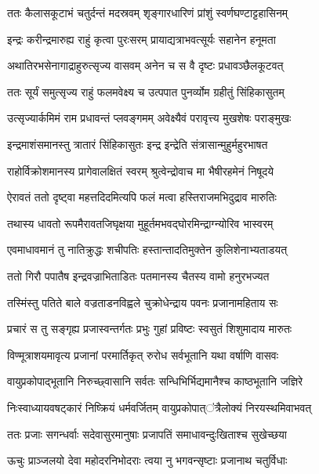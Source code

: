\twolineshloka
{ततः कैलासकूटाभं चतुर्दन्तं मदस्रवम्}
{शृङ्गारधारिणं प्रांशुं स्वर्णघण्टाट्टहासिनम्} %

\twolineshloka
{इन्द्रः करीन्द्रमारुह्य राहुं कृत्वा पुरःसरम्}
{प्रायाद्यत्राभवत्सूर्यः सहानेन हनूमता} %

\twolineshloka
{अथातिरभसेनागाद्राहुरुत्सृज्य वासवम्}
{अनेन च स वै दृष्टः प्रधावञ्छैलकूटवत्} %

\twolineshloka
{ततः सूर्यं समुत्सृज्य राहुं फलमवेक्ष्य च}
{उत्पपात पुनर्व्योम ग्रहीतुं सिंहिकासुतम्} %

\twolineshloka
{उत्सृज्यार्कमिमं राम प्रधावन्तं प्लवङ्गमम्}
{अवेक्ष्यैवं परावृत्त्य मुखशेषः पराङ्मुखः} %

\twolineshloka
{इन्द्रमाशंसमानस्तु त्रातारं सिंहिकासुतः}
{इन्द्र इन्द्रेति संत्रासान्मुहुर्महुरभाषत} %

\twolineshloka
{राहोर्विक्रोशमानस्य प्रागेवालक्षितं स्वरम्}
{श्रुत्वेन्द्रोवाच मा भैषीरहमेनं निषूदये} %

\twolineshloka
{ऐरावतं ततो दृष्ट्वा महत्तदिदमित्यपि}
{फलं मत्वा हस्तिराजमभिदुद्राव मारुतिः} %

\twolineshloka
{तथास्य धावतो रूपमैरावतजिघृक्षया}
{मुहूर्तमभवद्घोरमिन्द्राग्न्योरिव भास्वरम्} %

\twolineshloka
{एवमाधावमानं तु नातिक्रुद्धः शचीपतिः}
{हस्तान्तादतिमुक्तेन कुलिशेनाभ्यताडयत्} %

\twolineshloka
{ततो गिरौ पपातैष इन्द्रवज्राभिताडितः}
{पतमानस्य चैतस्य वामो हनुरभज्यत} %

\twolineshloka
{तस्मिंस्तु पतिते बाले वज्रताडनविह्वले}
{चुक्रोधेन्द्राय पवनः प्रजानामहिताय सः} %

\twolineshloka
{प्रचारं स तु सङ्गृह्य प्रजास्वन्तर्गतः प्रभुः}
{गुहां प्रविष्टः स्वसुतं शिशुमादाय मारुतः} %

\twolineshloka
{विण्मूत्राशयमावृत्य प्रजानां परमार्तिकृत्}
{रुरोध सर्वभूतानि यथा वर्षाणि वासवः} %

\twolineshloka
{वायुप्रकोपाद्भूतानि निरुच्छ्वासानि सर्वतः}
{सन्धिभिर्भिद्यमानैश्च काष्ठभूतानि जज्ञिरे} %

\twolineshloka
{निःस्वाध्यायवषट्कारं निष्क्रियं धर्मवर्जितम्}
{वायुप्रकोपात्ऺत्रैलोक्यं निरयस्थमिवाभवत्} %

\twolineshloka
{ततः प्रजाः सगन्धर्वाः सदेवासुरमानुषाः}
{प्रजापतिं समाधावन्दुःखिताश्च सुखेच्छया} %

\twolineshloka
{ऊचुः प्राञ्जलयो देवा महोदरनिभोदराः}
{त्वया नु भगवन्सृष्टाः प्रजानाथ चतुर्विधाः} %

